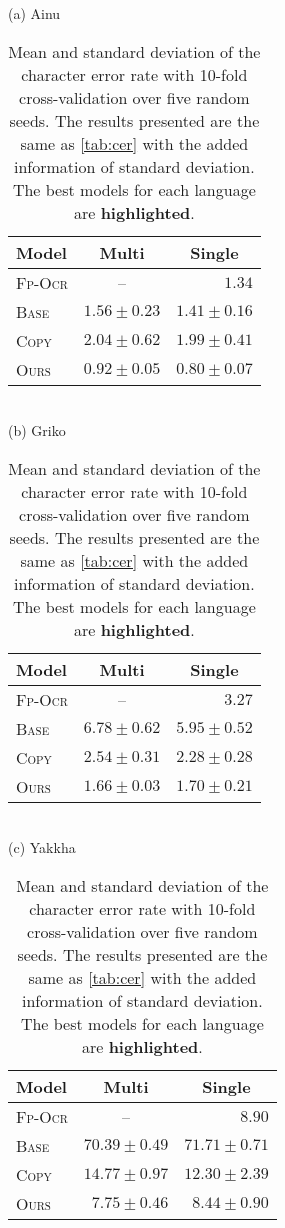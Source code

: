 \begin{table}[tb]
    \centering
    \small
    (a) Ainu\\
    \begin{tabular}{l|r@{\ \ \ }r}
    \toprule
        Model & \multicolumn{1}{c}{Multi} & \multicolumn{1}{c}{Single} \\
        \midrule
        \textsc{Fp-Ocr} & \multicolumn{1}{c}{--} & $1.34$ \\
        \textsc{Base} & $1.56 \pm 0.23$ & $1.41 \pm 0.16$ \\
        \textsc{Copy} & $2.04 \pm 0.62$ & $1.99 \pm 0.41$ \\
        \textsc{Ours} & $0.92 \pm 0.05$ & $\boldsymbol{0.80} \pm 0.07$ \\
    \bottomrule
    \end{tabular}\\
    \vspace{1em}
    (b) Griko\\
    \begin{tabular}{l|r@{\ \ \ }r}
    \toprule
        Model & \multicolumn{1}{c}{Multi} & \multicolumn{1}{c}{Single} \\
        \midrule
        \textsc{Fp-Ocr} & \multicolumn{1}{c}{--} & $3.27$ \\
        \textsc{Base} & $6.78 \pm 0.62$ & $5.95 \pm 0.52$ \\
        \textsc{Copy} & $2.54 \pm 0.31$ & $2.28 \pm 0.28$ \\
        \textsc{Ours} & $\boldsymbol{1.66} \pm 0.03$ & $1.70 \pm 0.21$ \\
    \bottomrule
    \end{tabular}\\
    \vspace{1em}
    (c) Yakkha\\
    \begin{tabular}{l|r@{\ \ \ }r}
    \toprule
        Model & \multicolumn{1}{c}{Multi} & \multicolumn{1}{c}{Single} \\
        \midrule
        \textsc{Fp-Ocr} & \multicolumn{1}{c}{--} & $8.90$ \\
        \textsc{Base} & $70.39 \pm 0.49$ & $71.71 \pm 0.71$  \\
        \textsc{Copy} & $14.77 \pm 0.97$ & $12.30 \pm 2.39$ \\
        \textsc{Ours} & $\boldsymbol{7.75} \pm 0.46$ & $8.44 \pm 0.90$ \\
    \bottomrule
    \end{tabular}
    \caption{Mean and standard deviation of the character error rate with 10-fold cross-validation over five random seeds. The results presented are the same as \autoref{tab:cer} with the added information of standard deviation. The best models for each language are \textbf{highlighted}.}
    \label{tab:stddev_cer}
\end{table}

